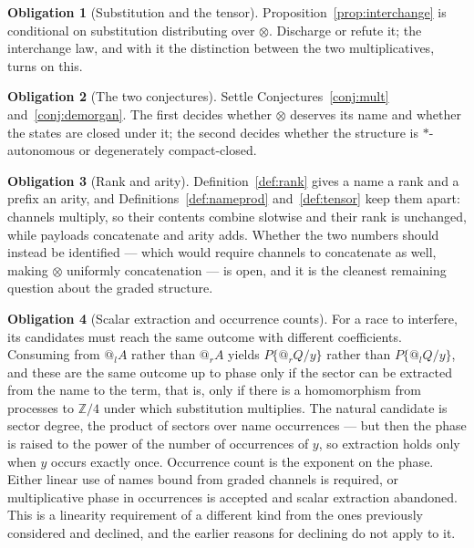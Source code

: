 \documentclass[11pt]{article}
\makeatletter
\theoremstyle{definition}
\newtheorem{obligation}{Obligation}
\theoremstyle{remark}
\newcommand{\quo}[1]{\ensuremath{@_{#1}}}
\makeatother
\begin{document}
\begin{obligation}[Substitution and the tensor]
\label{ob:subst}
Proposition~\ref{prop:interchange} is conditional on substitution distributing
over $\otimes$. Discharge or refute it; the interchange law, and with it the
distinction between the two multiplicatives, turns on this.
\end{obligation}

\begin{obligation}[The two conjectures]
\label{ob:conjectures}
Settle Conjectures~\ref{conj:mult} and~\ref{conj:demorgan}. The first decides
whether $\otimes$ deserves its name and whether the states are closed under it;
the second decides whether the structure is $*$-autonomous or degenerately
compact-closed.
\end{obligation}

\begin{obligation}[Rank and arity]
\label{ob:rankarity}
Definition~\ref{def:rank} gives a name a rank and a prefix an arity, and
Definitions~\ref{def:nameprod} and~\ref{def:tensor} keep them apart: channels
multiply, so their contents combine slotwise and their rank is unchanged, while
payloads concatenate and arity adds. Whether the two numbers should instead be
identified --- which would require channels to concatenate as well, making
$\otimes$ uniformly concatenation --- is open, and it is the cleanest remaining
question about the graded structure.
\end{obligation}

\begin{obligation}[Scalar extraction and occurrence counts]
\label{ob:linearity}
For a race to interfere, its candidates must reach the same outcome with
different coefficients. Consuming from $\quo{l}A$ rather than $\quo{r}A$ yields
$P\{\quo{r}Q/y\}$ rather than $P\{\quo{l}Q/y\}$, and these are the same outcome
up to phase only if the sector can be extracted from the name to the term, that
is, only if there is a homomorphism from processes to $\mathbb{Z}/4$ under which
substitution multiplies. The natural candidate is sector degree, the product of
sectors over name occurrences --- but then the phase is raised to the power of
the number of occurrences of $y$, so extraction holds only when $y$ occurs
exactly once. Occurrence count is the exponent on the phase. Either linear use
of names bound from graded channels is required, or multiplicative phase in
occurrences is accepted and scalar extraction abandoned. This is a linearity
requirement of a different kind from the ones previously considered and declined,
and the earlier reasons for declining do not apply to it.
\end{obligation}
\end{document}

